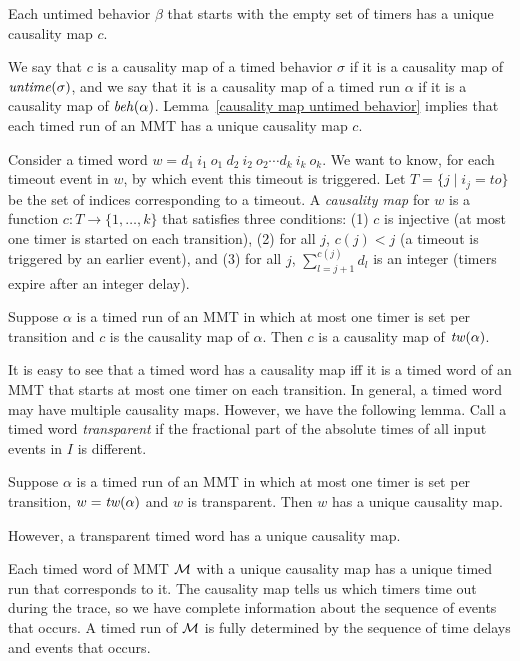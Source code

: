 \begin{lemma}
\label{causality map untimed behavior}
Each untimed behavior $\beta$ that starts with the empty set of timers has a unique causality map $c$.
\end{lemma}
We say that $c$ is a causality map of a timed behavior $\sigma$ if it is a causality map of $\mathit{untime}(\sigma)$,
and we say that it is a causality map of a timed run $\alpha$ if it is a causality map of $\mathit{beh}(\alpha)$.
Lemma~\ref{causality map untimed behavior} implies that each timed run of an MMT has a unique causality map $c$.

\fi
Consider a timed word
$w  =   d_1 ~ i_1 ~ o_1 ~ d_2 ~ i_2 ~ o_2 \cdots d_k ~ i_k ~ o_k$.
We want to know, for each timeout event in $w$, by which event this timeout is triggered.
Let $T = \{ j \mid i_j = \mathit{to} \}$ be the set of indices corresponding to a timeout.
A \emph{causality map} for $w$ is a function $c: T \rightarrow \{ 1 ,\ldots, k \}$ that satisfies three conditions:
(1)
$c$ is injective (at most one timer is started on each transition),
(2)
for all $j$, $c(j) < j$ (a timeout is triggered by an earlier event), and
(3)
for all $j$, $\sum_{l=j+1}^{c(j)} d_l$ is an integer (timers expire after an integer delay).
\iflong
\begin{lemma}
\label{causality map run is causility map of its timed word}
Suppose $\alpha$ is a timed run of an MMT in which at most one timer is set
per transition and $c$ is the causality map of $\alpha$. 
Then $c$ is a causality map of $\mathit{tw}(\alpha)$.
\end{lemma}
\else
It is easy to see that a timed word has a causality map iff it is a timed word of an MMT that starts at most one timer
on each transition. 
\fi
In general, a timed word may have multiple causality maps.
\iflong
However, we have the following lemma.
Call a timed word \emph{transparent} if the fractional part of the absolute times of all input events in $I$ is different.

\begin{lemma}
\label{lemma unique causality map}
Suppose $\alpha$ is a timed run of an MMT in which at most one timer is set
per transition, $w =  \mathit{tw}(\alpha)$ and $w$ is transparent. 
Then $w$ has a unique causality map.
\end{lemma}
\else
However, a transparent timed word has a unique causality map.
\fi

Each timed word of MMT ${\mathcal M}$ with a unique causality map has a unique timed run that corresponds to it.
The causality map tells us which timers time out during the trace, so we have complete information
about the sequence of events that occurs. 
\iflong
A timed run of ${\mathcal M}$ is fully determined
by the sequence of time delays and events that occurs.

